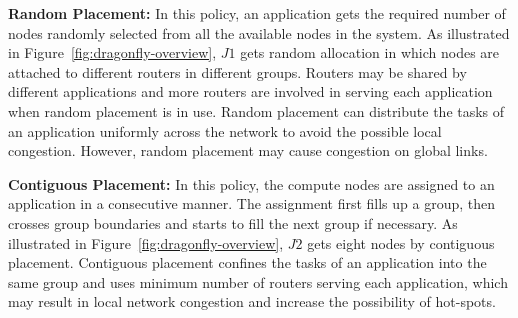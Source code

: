 \textbf{Random Placement:} In this policy, an application gets the required number of nodes randomly selected from all the available nodes in the system. As illustrated in Figure~\ref{fig:dragonfly-overview}, $J1$ gets random allocation in which nodes are attached to different routers in different groups. Routers may be shared by different applications and more routers are involved in serving each application when random placement is in use. Random placement can distribute the tasks of an application uniformly across the network to avoid the possible local congestion. However, random placement may cause congestion on global links.


\textbf{Contiguous Placement:} In this policy, the compute nodes are assigned to an application in a consecutive manner. The assignment first fills up a group, then crosses group boundaries and starts to fill the next group if necessary. As illustrated in Figure~\ref{fig:dragonfly-overview}, $J2$ gets eight nodes by contiguous placement. Contiguous placement confines the tasks of an application into the same group and uses minimum number of routers serving each application, which may result in local network congestion and increase the possibility of hot-spots. 
